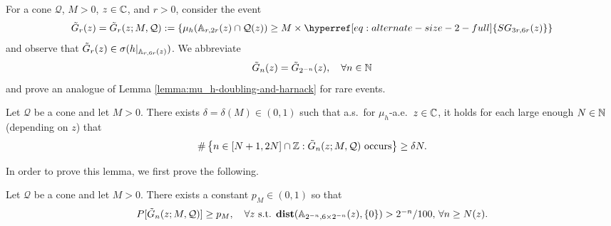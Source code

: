 \documentclass[12pt]{amsart}
\numberwithin{equation}{section}
\newcommand{\SGann}[2]{\hyperref[eq:alternate-size-2-full]{SG_{#1}(#2)}}
\begin{document}
	
	
	For a cone $\mathcal Q$, $M > 0$,  $z \in \mathbb{C}$, and $r > 0$, consider the event
	\begin{equation} \label{eq:mu-h-wild}
	\tilde G_{r}(z) = \tilde G_{r}(z; M, \mathcal Q) := \left\{\mu_{h}(\A_{r, 2r}(z) \cap \mathcal Q(z)) \geq  M \times \SGann{3r, 6r}{z} \right\}
	\end{equation}
	and observe that $\tilde G_{r}(z) \in \sigma(h |_{\mathbb{A}_{r, 6r}(z)})$.
	We abbreviate
	\begin{equation}
	\tilde G_n(z) = \tilde G_{2^{-n}}(z), \quad \forall n\in\mathbb{N} 
	\end{equation}
	and prove an analogue of Lemma \ref{lemma:mu_h-doubling-and-harnack} for rare events.  
	\begin{lemma} \label{lemma:mu_h-bad-and-harnack}
		Let $\mathcal Q$ be a cone and let $M > 0$. There exists $\delta = \delta(M) \in (0,1)$ such that a.s.\ for $\mu_h$-a.e.\ $z\in  \mathbb{C}$, it holds for each large enough $N\in \mathbb{N}$ (depending on $z$) that
		\begin{equation} \label{eq:mu_h-bad}
		\#\left\{ n \in [N+1,2N] \cap \mathbb{Z}  : \mbox{$\tilde G_n(z; M, \mathcal Q)$ occurs} \right\}  \geq \delta N.
		\end{equation}  
	\end{lemma}
	In order to prove this lemma, we first prove the following.
	\begin{lemma} \label{lemma:positive-probability}
		Let $\mathcal Q$ be a cone and let $M > 0$. There exists a constant $p_M \in (0,1)$ so  that
		\begin{equation} \label{eq:desired-claim}
		P[ \tilde G_n(z; M, \mathcal Q)] \geq p_M, \quad \mbox{$\forall z$ s.t. $\mathop{\bf dist{}}(\mathbb{A}_{2^{-n}, 6 \times 2^{-n}}(z), \{0\}) > 2^{-n}/100$,  $\forall n \geq N(z)$.}
		\end{equation}
	\end{lemma}
	
\end{document}
